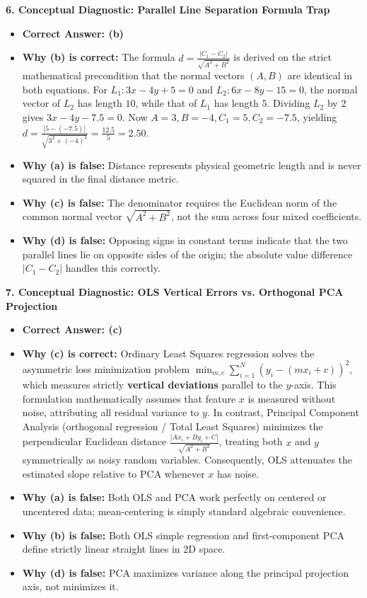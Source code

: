 \textbf{6. Conceptual Diagnostic: Parallel Line Separation Formula Trap}
\begin{itemize}
    \item \textbf{Correct Answer: (b)}
    \item \textbf{Why (b) is correct:} The formula $d = \frac{|C_1 - C_2|}{\sqrt{A^2 + B^2}}$ is derived on the strict mathematical precondition that the normal vectors $(A, B)$ are identical in both equations. For $L_1: 3x - 4y + 5 = 0$ and $L_2: 6x - 8y - 15 = 0$, the normal vector of $L_2$ has length $10$, while that of $L_1$ has length $5$. Dividing $L_2$ by $2$ gives $3x - 4y - 7.5 = 0$. Now $A = 3, B = -4, C_1 = 5, C_2 = -7.5$, yielding $d = \frac{|5 - (-7.5)|}{\sqrt{3^2 + (-4)^2}} = \frac{12.5}{5} = \mathbf{2.50}$.
    \item \textbf{Why (a) is false:} Distance represents physical geometric length and is never squared in the final distance metric.
    \item \textbf{Why (c) is false:} The denominator requires the Euclidean norm of the common normal vector $\sqrt{A^2 + B^2}$, not the sum across four mixed coefficients.
    \item \textbf{Why (d) is false:} Opposing signs in constant terms indicate that the two parallel lines lie on opposite sides of the origin; the absolute value difference $|C_1 - C_2|$ handles this correctly.
\end{itemize}

\textbf{7. Conceptual Diagnostic: OLS Vertical Errors vs. Orthogonal PCA Projection}
\begin{itemize}
    \item \textbf{Correct Answer: (c)}
    \item \textbf{Why (c) is correct:} Ordinary Least Squares regression solves the asymmetric loss minimization problem $\min_{m, c} \sum_{i=1}^N (y_i - (mx_i + c))^2$, which measures strictly \textbf{vertical deviations} parallel to the $y$-axis. This formulation mathematically assumes that feature $x$ is measured without noise, attributing all residual variance to $y$. In contrast, Principal Component Analysis (orthogonal regression / Total Least Squares) minimizes the perpendicular Euclidean distance $\frac{|Ax_i + By_i + C|}{\sqrt{A^2 + B^2}}$, treating both $x$ and $y$ symmetrically as noisy random variables. Consequently, OLS attenuates the estimated slope relative to PCA whenever $x$ has noise.
    \item \textbf{Why (a) is false:} Both OLS and PCA work perfectly on centered or uncentered data; mean-centering is simply standard algebraic convenience.
    \item \textbf{Why (b) is false:} Both OLS simple regression and first-component PCA define strictly linear straight lines in 2D space.
    \item \textbf{Why (d) is false:} PCA maximizes variance along the principal projection axis, not minimizes it.
\end{itemize}

